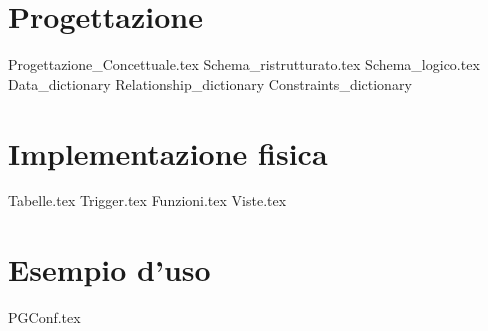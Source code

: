 \documentclass[a4paper,oneside, 11pt]{book}
\begin{document}
\chapter{Progettazione}
{Progettazione_Concettuale.tex}
{Schema_ristrutturato.tex}
{Schema_logico.tex}
{Data_dictionary}
{Relationship_dictionary}
{Constraints_dictionary}
\chapter{Implementazione fisica}
{Tabelle.tex}
{Trigger.tex}
{Funzioni.tex}
{Viste.tex}
\chapter{Esempio d'uso}
{PGConf.tex}
\end{document}
